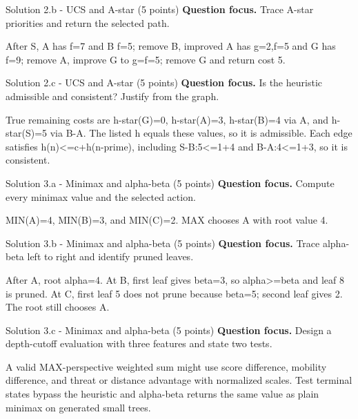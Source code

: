 \documentclass[aspectratio=169,11pt]{beamer}
\begin{document}
\begin{frame}{Solution 2.b - UCS and A-star (5 points)}
\small
\textbf{Question focus.} Trace A-star priorities and return the selected path.

\vspace{0.25cm}
\answerlabel After S, A has f=7 and B f=5; remove B, improved A has g=2,f=5 and G has f=9; remove A, improve G to g=f=5; remove G and return cost 5.
\end{frame}

\begin{frame}{Solution 2.c - UCS and A-star (5 points)}
\small
\textbf{Question focus.} Is the heuristic admissible and consistent? Justify from the graph.

\vspace{0.25cm}
\answerlabel True remaining costs are h-star(G)=0, h-star(A)=3, h-star(B)=4 via A, and h-star(S)=5 via B-A. The listed h equals these values, so it is admissible. Each edge satisfies h(n)<=c+h(n-prime), including S-B:5<=1+4 and B-A:4<=1+3, so it is consistent.
\end{frame}

\begin{frame}{Solution 3.a - Minimax and alpha-beta (5 points)}
\small
\textbf{Question focus.} Compute every minimax value and the selected action.

\vspace{0.25cm}
\answerlabel MIN(A)=4, MIN(B)=3, and MIN(C)=2. MAX chooses A with root value 4.
\end{frame}

\begin{frame}{Solution 3.b - Minimax and alpha-beta (5 points)}
\small
\textbf{Question focus.} Trace alpha-beta left to right and identify pruned leaves.

\vspace{0.25cm}
\answerlabel After A, root alpha=4. At B, first leaf gives beta=3, so alpha>=beta and leaf 8 is pruned. At C, first leaf 5 does not prune because beta=5; second leaf gives 2. The root still chooses A.
\end{frame}

\begin{frame}{Solution 3.c - Minimax and alpha-beta (5 points)}
\small
\textbf{Question focus.} Design a depth-cutoff evaluation with three features and state two tests.

\vspace{0.25cm}
\answerlabel A valid MAX-perspective weighted sum might use score difference, mobility difference, and threat or distance advantage with normalized scales. Test terminal states bypass the heuristic and alpha-beta returns the same value as plain minimax on generated small trees.
\end{frame}
\end{document}

